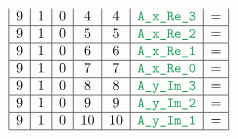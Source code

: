 \begin{figure}[h!]
\begin{adjustwidth}{-2cm}{-2cm}
{\[\begin{array}{|c|c|c|c|c|c|c|}
                    9                      & 1                                       & 0                                         & 4                      & 4                   & \locAXReThree & =                                                                                                                                                                 \\ \hline
                    9                      & 1                                       & 0                                         & 5                      & 5                   & \locAXReTwo   & =                                                                                                                                                                 \\ \hline
                    9                      & 1                                       & 0                                         & 6                      & 6                   & \locAXReOne   & =                                                                                                                                                                 \\ \hline
                    9                      & 1                                       & 0                                         & 7                      & 7                   & \locAXReZero  & =                                                                                                                                                                 \\ \hline
                    9                      & 1                                       & 0                                         & 8                      & 8                   & \locAYImThree & =                                                                                                                                                                 \\ \hline
                    9                      & 1                                       & 0                                         & 9                      & 9                   & \locAYImTwo   & =                                                                                                                                                                 \\ \hline
                    9                      & 1                                       & 0                                         & 10                     & 10                  & \locAYImOne   & =                                                                                                                                                                 \\ \hline

\end{array}\]}
\end{adjustwidth}
\end{figure}
